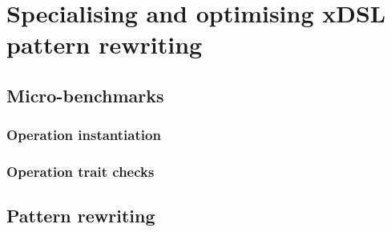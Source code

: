 \chapter{Specialising and optimising xDSL pattern rewriting}
\label{chap:specialising-optimising-pattern-rewriting}


\section{Micro-benchmarks}
\label{sec:specialising-ubenchmarks}



\subsection{Operation instantiation}
\label{sec:specialising-ubenchmarks-instantiation}






\subsection{Operation trait checks}
\label{ssec:specialising-ubenchmarks-trait}













\section{Pattern rewriting}
\label{sec:specialising-pattern-rewriting}


